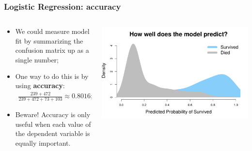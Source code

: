 \documentclass[aspectratio=169]{beamer}
\theoremstyle{principle}
\begin{document}
\begin{frame}
\frametitle{Logistic Regression: accuracy}

\begin{columns}
\begin{column}{0.5\textwidth}

\begin{itemize}
\item We could measure model fit by summarizing the confusion matrix up as a single number;
\bigskip
\bigskip

\item One way to do this is by using \textbf{accuracy}:
\begin{align*}
\frac{239 + 472}{239 + 472 + 73 + 103}\approx 0.8016;
\end{align*}
\bigskip

\item Beware!  Accuracy is only useful when each value of the dependent variable is equally important.

\end{itemize}

\end{column}
\begin{column}{0.5\textwidth}

\includegraphics[scale=0.35]{titanic_prediction_dens.pdf}

\end{column}
\end{columns}

\end{frame}
\end{document}
